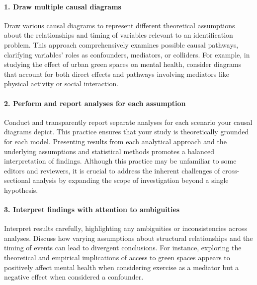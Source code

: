 \documentclass[
  singlecolumn]{article}
\let\oldparagraph\paragraph
\renewcommand{\paragraph}[1]{\oldparagraph{#1}\mbox{}}
\begin{document}
\paragraph{\texorpdfstring{1. \textbf{Draw multiple causal
diagrams}}{1. Draw multiple causal diagrams}}\label{draw-multiple-causal-diagrams}

Draw various causal diagrams to represent different theoretical
assumptions about the relationships and timing of variables relevant to
an identification problem. This approach comprehensively examines
possible causal pathways, clarifying variables' roles as confounders,
mediators, or colliders. For example, in studying the effect of urban
green spaces on mental health, consider diagrams that account for both
direct effects and pathways involving mediators like physical activity
or social interaction.

\paragraph{\texorpdfstring{2. \textbf{Perform and report analyses for
each
assumption}}{2. Perform and report analyses for each assumption}}\label{perform-and-report-analyses-for-each-assumption}

Conduct and transparently report separate analyses for each scenario
your causal diagrams depict. This practice ensures that your study is
theoretically grounded for each model. Presenting results from each
analytical approach and the underlying assumptions and statistical
methods promotes a balanced interpretation of findings. Although this
practice may be unfamiliar to some editors and reviewers, it is crucial
to address the inherent challenges of cross-sectional analysis by
expanding the scope of investigation beyond a single hypothesis.

\paragraph{\texorpdfstring{3. \textbf{Interpret findings with attention
to
ambiguities}}{3. Interpret findings with attention to ambiguities}}\label{interpret-findings-with-attention-to-ambiguities}

Interpret results carefully, highlighting any ambiguities or
inconsistencies across analyses. Discuss how varying assumptions about
structural relationships and the timing of events can lead to divergent
conclusions. For instance, exploring the theoretical and empirical
implications of access to green spaces appears to positively affect
mental health when considering exercise as a mediator but a negative
effect when considered a confounder.
\end{document}
